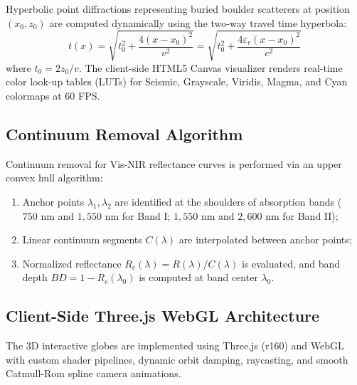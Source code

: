 Hyperbolic point diffractions representing buried boulder scatterers at position $(x_0, z_0)$ are computed dynamically using the two-way travel time hyperbola:
\begin{equation}
    t(x) = \sqrt{t_0^2 + \frac{4(x - x_0)^2}{v^2}} = \sqrt{t_0^2 + \frac{4\varepsilon_r (x - x_0)^2}{c^2}}
    \label{eq:hyperbola}
\end{equation}
where $t_0 = 2z_0 / v$. The client-side HTML5 Canvas visualizer renders real-time color look-up tables (LUTs) for Seismic, Grayscale, Viridis, Magma, and Cyan colormaps at 60 FPS.

\subsection{Continuum Removal Algorithm}

Continuum removal for Vis-NIR reflectance curves is performed via an upper convex hull algorithm:
\begin{enumerate}
    \item Anchor points $\lambda_1, \lambda_2$ are identified at the shoulders of absorption bands ($750\text{ nm}$ and $1,550\text{ nm}$ for Band I; $1,550\text{ nm}$ and $2,600\text{ nm}$ for Band II);
    \item Linear continuum segments $C(\lambda)$ are interpolated between anchor points;
    \item Normalized reflectance $R_c(\lambda) = R(\lambda) / C(\lambda)$ is evaluated, and band depth $BD = 1 - R_c(\lambda_0)$ is computed at band center $\lambda_0$.
\end{enumerate}

\subsection{Client-Side Three.js WebGL Architecture}

The 3D interactive globes are implemented using Three.js (r160) and WebGL with custom shader pipelines, dynamic orbit damping, raycasting, and smooth Catmull-Rom spline camera animations.
